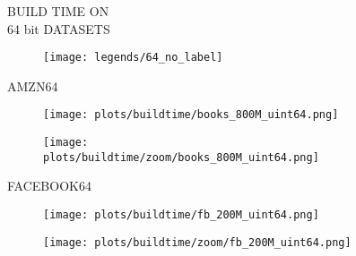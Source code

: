 \documentclass{article}
\begin{document}
\begin{figure}[!htbp]
\fbox
{
\begin{minipage}[t][0.98\textheight][t]{\textwidth}
\centering
\vspace*{-0.4cm}
    \begin{minipage}{0.2\linewidth}
    \footnotesize{BUILD TIME ON  \\ 64 bit DATASETS}
    \end{minipage}
   \begin{minipage}{0.75\linewidth}
        \begin{figure}[H]
        \texttt{[image: legends/64\_no\_label]}
        \end{figure}
    \end{minipage}
    \vspace*{-18px}
    
    \begin{minipage}{0.03\linewidth}
    \begin{sideways}\small AMZN64\end{sideways}
    \end{minipage}
    \begin{minipage}{0.39\linewidth}
        \begin{figure}[H]
        \texttt{[image: plots/buildtime/books\_800M\_uint64.png]}
        \end{figure}
    \end{minipage}
    \begin{minipage}{0.39\linewidth}
        \begin{figure}[H]
            \texttt{[image: plots/buildtime/zoom/books\_800M\_uint64.png]}
        \end{figure}
    \end{minipage}
\vspace*{-0.6cm}

\begin{minipage}{0.03\linewidth}
    \begin{sideways}\small FACEBOOK64\end{sideways}
    \end{minipage}
    \begin{minipage}{0.39\linewidth}
        \begin{figure}[H]
        \texttt{[image: plots/buildtime/fb\_200M\_uint64.png]}
        \end{figure}
    \end{minipage}
    \begin{minipage}{0.39\linewidth}
        \begin{figure}[H]
            \texttt{[image: plots/buildtime/zoom/fb\_200M\_uint64.png]}
        \end{figure}
    \end{minipage}
\vspace*{-0.6cm}


\end{minipage}}
\end{figure}
\end{document}

